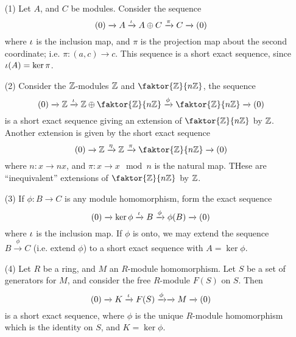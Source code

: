 \begin{example}\label{example_4.15}
    \begin{enumerate}
        \item[(1)] Let $A$, and $C$ be modules. Consider the sequence
            \begin{equation*}
                (0) \xrightarrow{} A \xrightarrow{\iota} A \oplus C
                \xrightarrow{\pi} C \xrightarrow{} (0)
            \end{equation*}
            where $\iota$ is the inclusion map, and  $\pi$ is the projection map
            about the second coordinate; i.e. $\pi:(a,c) \xrightarrow{} c$. This
            sequence is a short exact sequence, since $\iota(A)=\ker{\pi}$.

        \item[(2)] Consider the $\mathbb{Z}$-modules $\mathbb{Z}$ and $\faktor{\Z}{n\Z}$,
            the sequence
            \begin{equation*}
                (0) \xrightarrow{} \Z \xrightarrow{\i} \Z \oplus \faktor{\Z}{n\Z}
                \xrightarrow{\phi} \faktor{\Z}{n\Z} \xrightarrow{} (0)
            \end{equation*}
            is a short exact sequence giving an extension of $\faktor{\Z}{n\Z}$
            by $\mathbb{Z}$. Another extension is given by the short exact sequence
            \begin{equation*}
                (0) \xrightarrow{} \Z \xrightarrow{\n} \Z
                \xrightarrow{\pi} \faktor{\Z}{n\Z} \xrightarrow{} (0)
            \end{equation*}
            where $n:x \xrightarrow{} nx$, and $\pi:x \xrightarrow{} x \mod{n}$
            is the natural map. THese are ``inequivalent'' extensions of
            $\faktor{\Z}{n\Z}$ by $\mathbb{Z}$.

        \item [(3)] If $\phi:B \xrightarrow{} C$ is any module homomorphism,
            form the exact sequence
            \begin{equation*}
                (0) \xrightarrow{} \ker{\phi} \xrightarrow{\iota} B
                \xrightarrow{\phi} \phi(B) \xrightarrow{} (0)
            \end{equation*}
            where $\iota$ is the inclusion map. If  $\phi$ is onto, we may extend
            the sequence $B \xrightarrow{\phi} C$ (i.e. extend $\phi$) to a
            short exact sequence with $A=\ker{\phi}$.

        \item[(4)] Let $R$ be a ring, and  $M$ an  $R$-module homomorphism. Let
             $S$ be a set of generators for  $M$, and consider the free $R$-module
             $F(S)$ on $S$. Then
             \begin{equation*}
                 (0) \xrightarrow{} K \xrightarrow{\iota} F(S) \xrightarrow{\phi}
                 \xrightarrow{} M \xrightarrow{} (0)
             \end{equation*}
             is a short exact sequence,  where $\phi$ is the unique  $R$-module
             homomorphism  which is the identity on $S$, and  $K=\ker{\phi}$.
    \end{enumerate}
\end{example}

